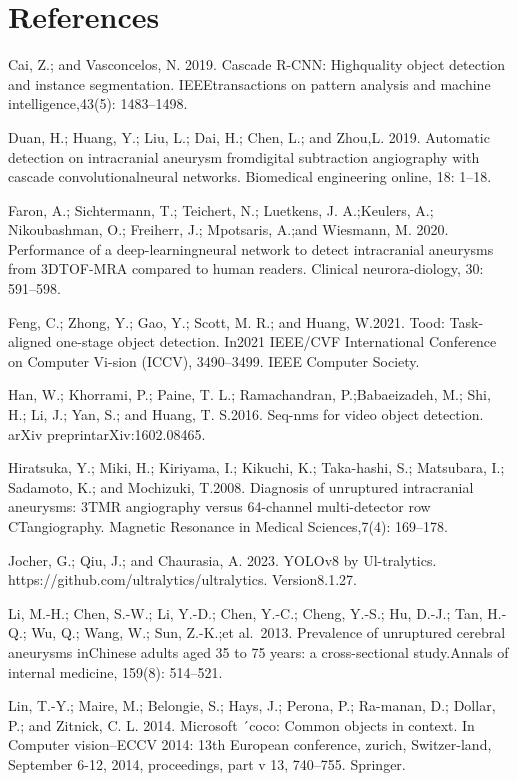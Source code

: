 \documentclass[
  10
]{article}
\begin{document}
\section{References}\label{references}

Cai, Z.; and Vasconcelos, N. 2019. Cascade R-CNN: Highquality object
detection and instance segmentation. IEEEtransactions on pattern
analysis and machine intelligence,43(5): 1483--1498.

Duan, H.; Huang, Y.; Liu, L.; Dai, H.; Chen, L.; and Zhou,L. 2019.
Automatic detection on intracranial aneurysm fromdigital subtraction
angiography with cascade convolutionalneural networks. Biomedical
engineering online, 18: 1--18.

Faron, A.; Sichtermann, T.; Teichert, N.; Luetkens, J. A.;Keulers, A.;
Nikoubashman, O.; Freiherr, J.; Mpotsaris, A.;and Wiesmann, M. 2020.
Performance of a deep-learningneural network to detect intracranial
aneurysms from 3DTOF-MRA compared to human readers. Clinical
neurora-diology, 30: 591--598.

Feng, C.; Zhong, Y.; Gao, Y.; Scott, M. R.; and Huang, W.2021. Tood:
Task-aligned one-stage object detection. In2021 IEEE/CVF International
Conference on Computer Vi-sion (ICCV), 3490--3499. IEEE Computer
Society.

Han, W.; Khorrami, P.; Paine, T. L.; Ramachandran, P.;Babaeizadeh, M.;
Shi, H.; Li, J.; Yan, S.; and Huang, T. S.2016. Seq-nms for video object
detection. arXiv preprintarXiv:1602.08465.

Hiratsuka, Y.; Miki, H.; Kiriyama, I.; Kikuchi, K.; Taka-hashi, S.;
Matsubara, I.; Sadamoto, K.; and Mochizuki, T.2008. Diagnosis of
unruptured intracranial aneurysms: 3TMR angiography versus 64-channel
multi-detector row CTangiography. Magnetic Resonance in Medical
Sciences,7(4): 169--178.

Jocher, G.; Qiu, J.; and Chaurasia, A. 2023. YOLOv8 by Ul-tralytics.
https://github.com/ultralytics/ultralytics. Version8.1.27.

Li, M.-H.; Chen, S.-W.; Li, Y.-D.; Chen, Y.-C.; Cheng, Y.-S.; Hu, D.-J.;
Tan, H.-Q.; Wu, Q.; Wang, W.; Sun, Z.-K.;et al.~2013. Prevalence of
unruptured cerebral aneurysms inChinese adults aged 35 to 75 years: a
cross-sectional study.Annals of internal medicine, 159(8): 514--521.

Lin, T.-Y.; Maire, M.; Belongie, S.; Hays, J.; Perona, P.; Ra-manan, D.;
Dollar, P.; and Zitnick, C. L. 2014. Microsoft ´coco: Common objects in
context. In Computer vision--ECCV 2014: 13th European conference,
zurich, Switzer-land, September 6-12, 2014, proceedings, part v 13,
740--755. Springer.
\end{document}
